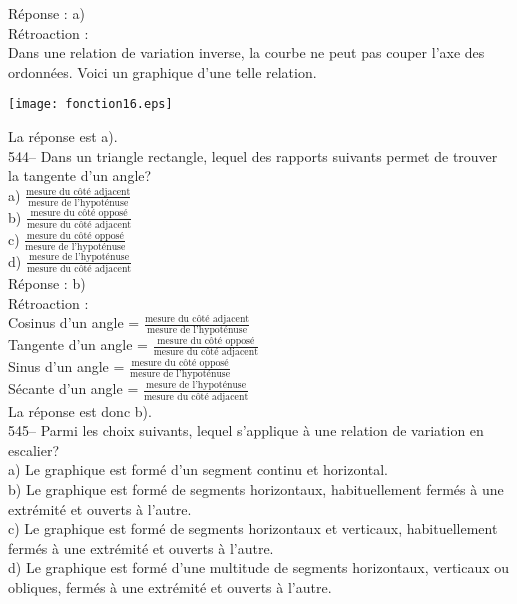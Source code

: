 ﻿\documentclass[letterpaper, 12pt]{article}
\begin{document}
R\'eponse : a)\\

R\'etroaction : \\
Dans une relation de variation inverse, la courbe ne peut pas couper
l'axe des ordonn\'ees. Voici un graphique d'une telle relation.
    \begin{center}
    \texttt{[image: fonction16.eps]}
    \end{center}
La r\'eponse est a).\\

544-- Dans un triangle rectangle, lequel des rapports suivants permet de
trouver la tangente d'un angle?\\[2mm]
a) $\frac{\textrm{mesure du c\^ot\'e adjacent}}{\textrm{mesure de
l'hypot\'enuse}}$\\[2mm]
b) $\frac{\textrm{mesure du c\^ot\'e oppos\'e}}{\textrm{mesure du c\^ot\'e
adjacent}}$\\[2mm]
c) $\frac{\textrm{mesure du c\^ot\'e oppos\'e}}{\textrm{mesure de
l'hypot\'enuse}}$\\[2mm]
d) $\frac{\textrm{mesure de l'hypot\'enuse}}{\textrm{mesure du c\^ot\'e
adjacent}}$\\

R\'eponse : b)\\

R\'etroaction : \\
Cosinus d'un angle = $\frac{\textrm{mesure du c\^ot\'e
adjacent}}{\textrm{mesure de l'hypot\'enuse}}$\\[2mm]
Tangente d'un angle = $\frac{\textrm{mesure du c\^ot\'e
oppos\'e}}{\textrm{mesure du c\^ot\'e adjacent}}$\\[2mm]
Sinus d'un angle = $\frac{\textrm{mesure du c\^ot\'e
oppos\'e}}{\textrm{mesure de l'hypot\'enuse}}$\\[2mm]
S\'ecante d'un angle =  $\frac{\textrm{mesure de
l'hypot\'enuse}}{\textrm{mesure du c\^ot\'e adjacent}}$\\[2mm]
La r\'eponse est donc b).\\

545-- Parmi les choix suivants, lequel s'applique \`a une relation de
variation en escalier?\\
a) Le graphique est form\'e d'un segment continu et horizontal. \\
b) Le graphique est form\'e de segments horizontaux, habituellement ferm\'es
\`a une extr\'emit\'e et ouverts \`a l'autre.\\
c) Le graphique est form\'e de segments horizontaux et verticaux,
habituellement ferm\'es \`a une extr\'emit\'e et ouverts \`a l'autre.\\
d) Le graphique est form\'e d'une multitude de segments horizontaux,
verticaux ou obliques, ferm\'es \`a une extr\'emit\'e et ouverts \`a
l'autre.\\
\end{document}
